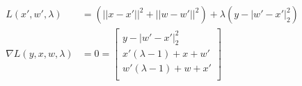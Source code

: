 \begin{equation}
    \begin{split}
        L\left(x',w',\lambda\right) &= \left(||x-x'||^2 + ||w-w'||^2\right) +\lambda\left(y-|w' - x'|^2_2\right) \\
        \nabla L\left(y,x,w,\lambda\right) &=  0=
    \begin{bmatrix}
        y-|w' - x'|^2_2\\
        x'(\lambda -1) + x + w'\\
        w'(\lambda -1) + w + x'\\
    \end{bmatrix}
    \end{split}
\end{equation}


